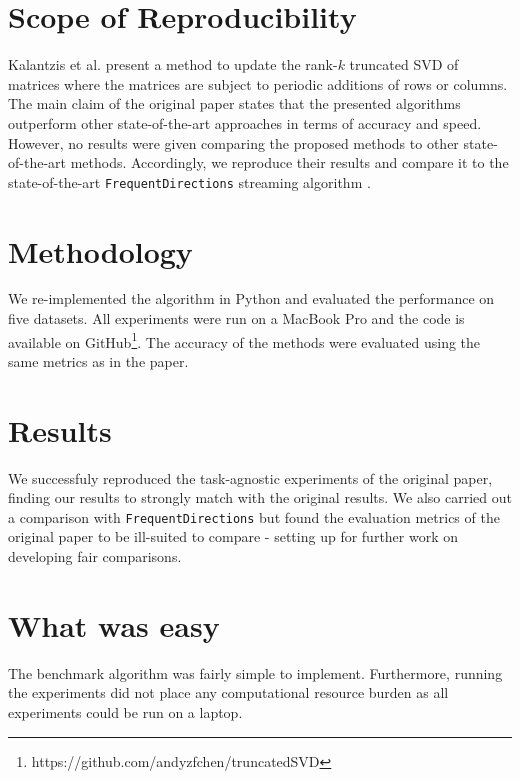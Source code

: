 \label{sec:summary}

\section*{Scope of Reproducibility}

Kalantzis et al. \cite{Kalantzis2021} present a method to update the rank-$k$ truncated SVD of matrices where the matrices are subject to periodic additions of rows or columns.
The main claim of the original paper states that the presented algorithms outperform other state-of-the-art approaches in terms of accuracy and speed.
However, no results were given comparing the proposed methods to other state-of-the-art methods.
Accordingly, we reproduce their results and compare it to the state-of-the-art \verb|FrequentDirections| streaming algorithm \cite{Ghashami2016}.

\section*{Methodology}

We re-implemented the algorithm in Python and evaluated the performance on five datasets.
All experiments were run on a MacBook Pro and the code is available on GitHub\footnote{https://github.com/andyzfchen/truncatedSVD}.
The accuracy of the methods were evaluated using the same metrics as in the paper.

\section*{Results}

We successfuly reproduced the task-agnostic experiments of the original paper, finding our results to strongly match with the original results.
We also carried out a comparison with \verb|FrequentDirections| but found the evaluation metrics of the original paper to be ill-suited to compare - setting up for further work on developing fair comparisons. 

\section*{What was easy}

The benchmark algorithm was fairly simple to implement.
Furthermore, running the experiments did not place any computational resource burden as all experiments could be run on a laptop.

